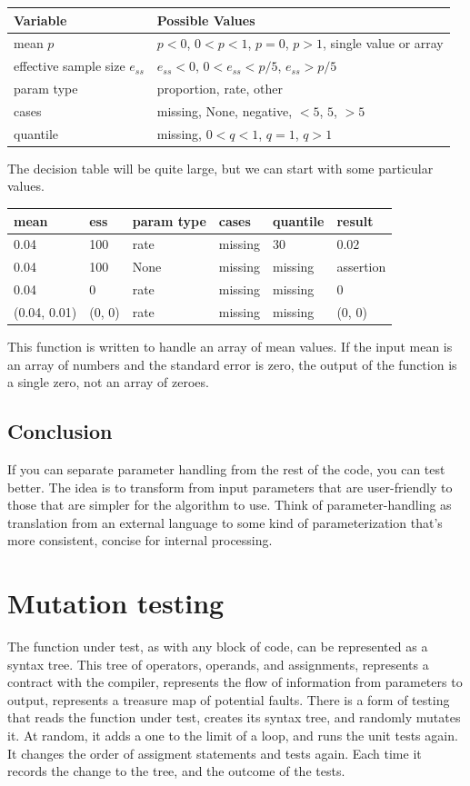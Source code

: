 \documentclass[fleqn,10pt]{olplainarticle}
\begin{document}
\begin{center}
    \begin{tabular}{ll}
    \hline
    Variable & Possible Values \\ \hline
    mean $p$ & $p<0$, $0<p<1$, $p=0$, $p>1$, single value or array \\
    effective sample size $e_{ss}$ & $e_{ss} <0$, $0<e_{ss}<p/5$, $e_{ss}>p/5$ \\
    param type & proportion, rate, other \\
    cases & missing, None, negative, $<5$, $5$, $>5$ \\
    quantile & missing, $0<q<1$, $q=1$, $q>1$ \\ \hline
    \end{tabular}
\end{center}
The decision table will be quite large, but we can start with some
particular values.
\begin{center}
    \begin{tabular}{llllll}
    \hline
    mean & ess & param type & cases & quantile & result \\ \hline
    0.04 & 100 & rate & missing & 30 & $0.02$ \\
    0.04 & 100 & None & missing & missing & assertion \\
    0.04 & 0 & rate & missing & missing & 0 \\
    (0.04, 0.01) & (0, 0) & rate & missing & missing & (0, 0)
\end{tabular}
\end{center}

This function is written to handle an array of mean values.
If the input mean is an array of numbers and the standard error
is zero, the output of the function is a single zero, not an array
of zeroes.

\subsection{Conclusion}
If you can separate parameter handling from the rest of the code,
you can test better. The idea is to transform from input parameters
that are user-friendly to those that are simpler for the algorithm
to use.
Think of parameter-handling as translation from an external
     language to some kind of parameterization that's more
     consistent, concise for internal processing.


\section{Mutation testing}\label{sec:random-changes}
The function under test, as with any block of code, can be
represented as a syntax tree. This tree of operators, operands,
and assignments, represents a contract with the compiler,
represents the flow of information from parameters to output,
represents a treasure map of potential faults. There is a form
of testing that reads the function under test, creates its
syntax tree, and randomly mutates it. At random, it adds a one to the
limit of a loop, and runs the unit tests again. It changes
the order of assigment statements and tests again. Each time
it records the change to the tree, and the outcome of the tests.
\end{document}
